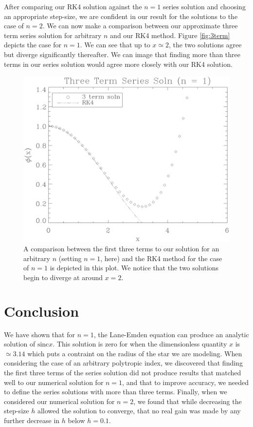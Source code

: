 \documentclass[12pt, manuscript]{article}
\begin{document}
After comparing our RK4 solution against the $n = 1$ series solution and choosing an appropriate step-size, we are confident in our result for the solutions to the case of $n = 2$. We can now make a comparison between our approximate three term series solution for arbitrary $n$ and our RK4 method. Figure \eqref{fig:3term} depicts the case for $n = 1$. We can see that up to $x \simeq 2$, the two solutions agree but diverge significantly thereafter. We can image that finding more than three terms in our series solution would agree more closely with our RK4 solution.
\begin{figure}[H]
    \begin{center}
        \includegraphics[scale=0.6]{images/3term_n1.eps}
        \caption{A comparison between the first three terms to our solution for an arbitrary $n$ (setting $n = 1$, here) and the RK4 method for the case of $n = 1$ is depicted in this plot. We notice that the two solutions begin to diverge at around $x = 2$.}\label{fig:3term}
    \end{center}
\end{figure}

\section*{Conclusion}
We have shown that for $n = 1$, the Lane-Emden equation can produce an analytic solution of $\text{sinc}x$. This solution is zero for when the dimensionless quantity $x$ is $\simeq 3.14$ which puts a contraint on the radius of the star we are modeling. When considering the case of an arbitrary polytropic index, we discovered that finding the first three terms of the series solution did not produce results that matched well to our numerical solution for $n = 1$, and that to improve accuracy, we needed to define the series solutions with more than three terms. Finally, when we considered our numerical solution for $n = 2$, we found that while decreasing the step-size $h$ allowed the solution to converge, that no real gain was made by any further decrease in $h$ below $h = 0.1$.
\end{document}

